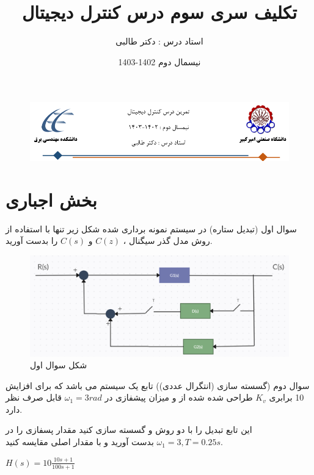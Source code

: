 \documentclass[12pt]{article}
\title{تکلیف سری سوم درس کنترل دیجیتال}
\date{نیسمال دوم 1402-1403}
\author{استاد درس : دکتر طالبی}
\begin{document}
\markboth{\theauthor}{\thetitle}



\begin{figure}[htbp]
    \centering
    \includegraphics[width=\linewidth]{Header.png}
\end{figure}


\section{بخش اجباری}

    \begin{problem}{سوال اول}
    (تبدیل ستاره) در سیستم نمونه برداری شده شکل زیر تنها با استفاده از روش مدل گذر سیگنال ، 
    $C(z)$
    و
    $C(s)$
    را بدست آورید.

    \end{problem}
    
    \begin{figure}
    	\includegraphics[width=\linewidth]{Resources/3.png}
    	\caption{شکل سوال اول}
    \end{figure}
    
    \begin{problem}{سوال دوم}
  (گسسته سازی (انتگرال عددی)) تابع یک سیستم  می باشد که برای افزایش 10 برابری 
  $K_v$
  طراحی شده شده از و میزان پیشفازی در 
  $\omega_1 = 3 rad$
  قابل صرف نظر دارد.
  
  این تابع تبدیل را با دو روش 
  و
  گسسته سازی کنید مقدار پسفازی را در 
  $\omega_1 = 3 , T = 0.25s$
  بدست آورید و با مقدار اصلی مقایسه کنید.
  
  \centering
 $H(s) = 10\frac{10s + 1}{100s + 1}$
    \end{problem}
    
\end{document}
